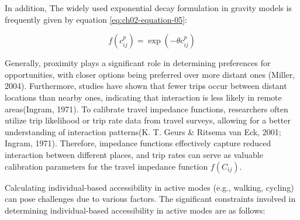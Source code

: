 \documentclass[
11pt, %
oneside, %
english, %
singlespacing, %
]{macthesis} %
\begin{document}
In addition, The widely used exponential decay formulation in gravity models is frequently given by equation \ref{eq:ch02-equation-05}:

\begin{equation}
f(c^p_{ij}) = \exp(-\theta c^p_{ij})
\label{eq:ch02-equation-05}
\end{equation}

Generally, proximity plays a significant role in determining preferences for opportunities, with closer options being preferred over more distant ones (Miller, 2004). Furthermore, studies have shown that fewer trips occur between distant locations than nearby ones, indicating that interaction is less likely in remote areas(Ingram, 1971). To calibrate travel impedance functions, researchers often utilize trip likelihood or trip rate data from travel surveys, allowing for a better understanding of interaction patterns(K. T. Geurs \& Ritsema van Eck, 2001; Ingram, 1971). Therefore, impedance functions effectively capture reduced interaction between different places, and trip rates can serve as valuable calibration parameters for the travel impedance function \(f(C_{ij})\).

Calculating individual-based accessibility in active modes (e.g., walking, cycling) can pose challenges due to various factors. The significant constraints involved in determining individual-based accessibility in active modes are as follows:
\end{document}
